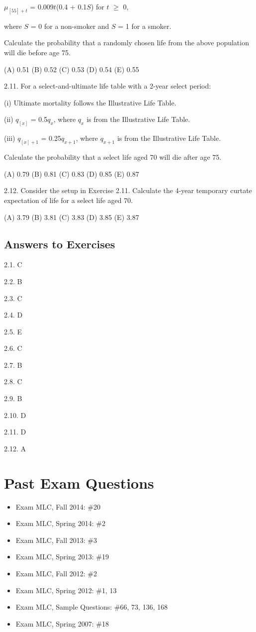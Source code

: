 \documentclass[]{book}
\begin{document}
\(\mu_{[55] + t}\) = 0.009\(t\)(0.4 + 0.1\(S\)) for \(t\) \(\ge\) 0,

where \(S\) = 0 for a non-smoker and \(S\) = 1 for a smoker.

Calculate the probability that a randomly chosen life from the above
population will die before age 75.

(A) 0.51 (B) 0.52 (C) 0.53 (D) 0.54 (E) 0.55

2.11. For a select-and-ultimate life table with a 2-year select period:

(i) Ultimate mortality follows the Illustrative Life Table.

(ii) \(q_{[x]}\) = 0.5\(q_x\), where \(q_x\) is from the Illustrative
Life Table.

(iii) \(q_{[x]+1}\) = 0.25\(q_{x + 1}\), where \(q_{x + 1}\) is from the
Illustrative Life Table.

Calculate the probability that a select life aged 70 will die after age
75.

(A) 0.79 (B) 0.81 (C) 0.83 (D) 0.85 (E) 0.87

2.12. Consider the setup in Exercise 2.11. Calculate the 4-year
temporary curtate expectation of life for a select life aged 70.

(A) 3.79 (B) 3.81 (C) 3.83 (D) 3.85 (E) 3.87

\subsection{Answers to Exercises}\label{answers-to-exercises-1}

2.1. C

2.2. B

2.3. C

2.4. D

2.5. E

2.6. C

2.7. B

2.8. C

2.9. B

2.10. D

2.11. D

2.12. A

\section{Past Exam Questions}\label{past-exam-questions-1}

\begin{itemize}
\item
  Exam MLC, Fall 2014: \#20
\item
  Exam MLC, Spring 2014: \#2
\item
  Exam MLC, Fall 2013: \#3
\item
  Exam MLC, Spring 2013: \#19
\item
  Exam MLC, Fall 2012: \#2
\item
  Exam MLC, Spring 2012: \#1, 13
\item
  Exam MLC, Sample Questions: \#66, 73, 136, 168
\item
  Exam MLC, Spring 2007: \#18
\end{itemize}
\end{document}

